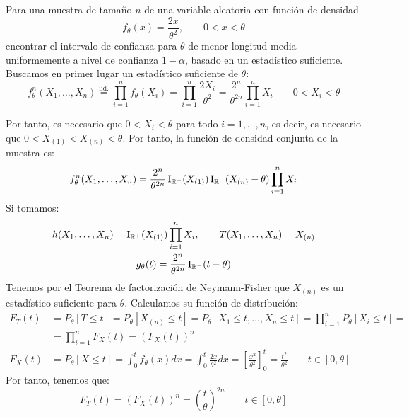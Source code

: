 \begin{ejercicio}
    Para una muestra de tamaño $n$ de una variable aleatoria con función de densidad
    \begin{equation*}
        f_\theta(x) = \frac{2x}{\theta^2}, \qquad 0<x<\theta
    \end{equation*}
    encontrar el intervalo de confianza para $\theta$ de menor longitud media uniformemente a nivel de confianza $1-\alpha$, basado en un estadístico suficiente.\\

    Buscamos en primer lugar un estadístico suficiente de $\theta$:
    \begin{equation*}
        f_\theta^n(X_1, \ldots, X_n) \stackrel{\text{iid.}}{=} \prod_{i=1}^{n}f_\theta(X_i) = \prod_{i=1}^{n}\frac{2X_i}{\theta^2} = \frac{2^n}{\theta^{2n}}\prod_{i=1}^{n}X_i \qquad 0<X_i<\theta
    \end{equation*}

    Por tanto, es necesario que $0<X_i<\theta$ para todo $i=1,\ldots,n$, es decir, es necesario que $0<X_{(1)}<X_{(n)}<\theta$. Por tanto, la función de densidad conjunta de la muestra es:
    \begin{equation*}
        f_\theta^n(X_1, \ldots, X_n) = \frac{2^n}{\theta^{2n}}\operatorname{I}_{\mathbb{R}^+}(X_{(1)})\operatorname{I}_{\mathbb{R} ^-}(X_{(n)}-\theta)\prod_{i=1}^n X_i
    \end{equation*}
    Si tomamos:
    \begin{gather*}
        h(X_1, \ldots, X_n) = \operatorname{I}_{\mathbb{R}^+}(X_{(1)})\prod_{i=1}^n X_i, \qquad T(X_1, \ldots, X_n) = X_{(n)} \\
        g_\theta(t) = \frac{2^n}{\theta^{2n}}\operatorname{I}_{\mathbb{R}^-}(t-\theta)
    \end{gather*}
    Tenemos por el Teorema de factorización de Neymann-Fisher que $X_{(n)}$ es un estadístico suficiente para $\theta$. Calculamos su función de distribución:
    \begin{align*}
        F_T(t) &= P_\theta[T\leq t] = P_\theta[X_{(n)}\leq t] = P_\theta[X_1\leq t, \ldots, X_n\leq t] = \prod_{i=1}^{n}P_\theta[X_i\leq t] =\\&= \prod_{i=1}^{n}F_X(t) = {(F_X(t))}^{n}\\
        F_X(t) &= P_\theta[X\leq t] = \int_{0}^{t}f_\theta(x)dx = \int_{0}^{t}\frac{2x}{\theta^2}dx = \left[\frac{x^2}{\theta^2}\right]_0^t = \frac{t^2}{\theta^2}\qquad t\in [0,\theta]
    \end{align*}
    Por tanto, tenemos que:
    \begin{equation*}
        F_T(t) = {(F_X(t))}^{n} = {\left(\frac{t}{\theta}\right)}^{2n}\qquad t\in [0,\theta]
    \end{equation*}


\end{ejercicio}
